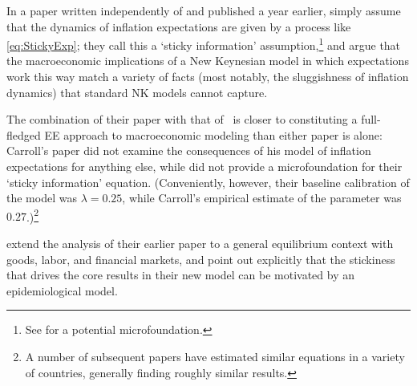 In a paper written independently of \cite{carroll2003macroeconomic} and published a year earlier, \cite{mr2002Sticky} simply assume that the dynamics of inflation expectations are given by a process like \eqref{eq:StickyExp}; they call this a `sticky information' assumption,\footnote{See \bvbayesianlearningFull for a potential microfoundation.} and argue that the macroeconomic implications of a New Keynesian model in which expectations work this way match a variety of facts (most notably, the sluggishness of inflation dynamics) that standard NK models cannot capture.

The combination of their paper with that of~\cite{carroll2003macroeconomic} is closer to constituting a full-fledged EE approach to macroeconomic modeling than either paper is alone: Carroll's paper did not examine the consequences of his model of inflation expectations for anything else, while \cite{mr2002Sticky} did not provide a microfoundation for their `sticky information' equation.  (Conveniently, however, their baseline calibration of the model was $\lambda=0.25$, while Carroll's empirical estimate of the parameter was $0.27$.)\footnote{A number of subsequent papers have estimated similar equations in a variety of countries, generally finding roughly similar results.}

\cite{mankiw2007sticky} extend the analysis of their earlier paper to a general equilibrium context with goods, labor, and financial markets, and point out explicitly that the stickiness that drives the core results in their new model can be motivated by an epidemiological model.

